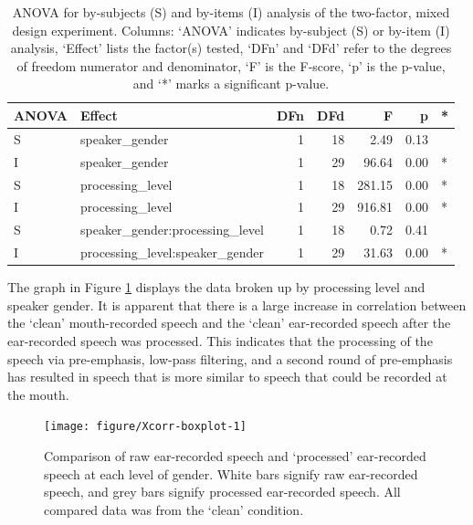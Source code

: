 \begin{table}[ht]
\centering
\begin{tabular}{llrrrrl}
  \hline
ANOVA & Effect & DFn & DFd & F & p & * \\ 
  \hline
S & speaker\_gender & 1 & 18 & 2.49 & 0.13 &  \\ 
  I & speaker\_gender & 1 & 29 & 96.64 & 0.00 & * \\ 
  S & processing\_level & 1 & 18 & 281.15 & 0.00 & * \\ 
  I & processing\_level & 1 & 29 & 916.81 & 0.00 & * \\ 
  S & speaker\_gender:processing\_level & 1 & 18 & 0.72 & 0.41 &  \\ 
  I & processing\_level:speaker\_gender & 1 & 29 & 31.63 & 0.00 & * \\ 
   \hline
\end{tabular}
\caption{ANOVA for by-subjects (S) and by-items (I) analysis of the two-factor, mixed design experiment. Columns: `ANOVA' indicates by-subject (S) or by-item (I) analysis, `Effect' lists the factor(s) tested, `DFn' and `DFd' refer to the degrees of freedom numerator and denominator, `F' is the F-score, `p' is the p-value, and `*' marks a significant p-value.} 
\label{tab:anova_data-collection}
\end{table}


The graph in Figure \ref{fig:data-collection-viz} displays the data broken up by processing level and speaker gender.  It is apparent that there is a large increase in correlation between the `clean' mouth-recorded speech and the `clean' ear-recorded speech after the ear-recorded speech was processed.  This indicates that the processing of the speech via pre-emphasis, low-pass filtering, and a second round of pre-emphasis has resulted in speech that is more similar to speech that could be recorded at the mouth.

\begin{figure}[H]
\centering

\texttt{[image: figure/Xcorr-boxplot-1]} 

\caption{Comparison of raw ear-recorded speech and `processed' ear-recorded speech at each level of gender.  White bars signify raw ear-recorded speech, and grey bars signify processed ear-recorded speech. All compared data was from the `clean' condition.}\label{fig:data-collection-viz}
\end{figure}

